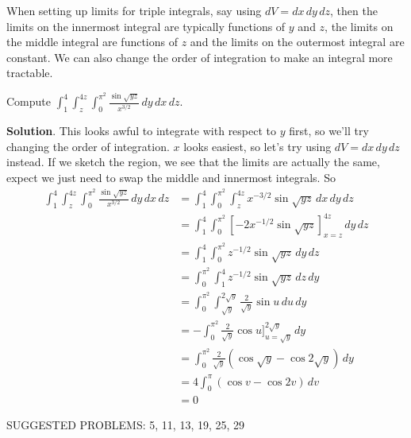 \documentclass[10pt,]{book}
\theoremstyle{ptxplainnotitle}
\theoremstyle{ptxplaintitle}
\theoremstyle{ptxplainnotitle}
\theoremstyle{ptxplaintitle}
\theoremstyle{ptxplainnotitle}
\theoremstyle{ptxplaintitle}
\theoremstyle{ptxdefinitionnotitle}
\theoremstyle{ptxdefinitiontitle}
\theoremstyle{ptxdefinitionnotitle}
\theoremstyle{ptxdefinitiontitle}
\theoremstyle{ptxdefinitionnotitle}
\theoremstyle{ptxdefinitiontitle}
\theoremstyle{ptxdefinitionnotitle}
\theoremstyle{ptxdefinitiontitle}
\theoremstyle{ptxdefinitionnotitle}
\theoremstyle{ptxdefinitiontitle}
\numberwithin{equation}{section}
\begin{document}
\hypertarget{p-1173}{}%
When setting up limits for triple integrals, say using \(dV = dx\,dy\,dz\), then the limits on the innermost integral are typically functions of \(y\) and \(z\), the limits on the middle integral are functions of \(z\) and the limits on the outermost integral are constant. We can also change the order of integration to make an integral more tractable.%
\begin{example}\label{example-changing-the-order-of-integration}
\hypertarget{p-1174}{}%
Compute \(\int_{1}^{4}\int_{z}^{4z}\int_{0}^{\pi^{2}}\frac{\sin\sqrt{yz}}{x^{3/2}}\,dy\,dx\,dz\).%
\par\smallskip%
\noindent\textbf{Solution}.\hypertarget{solution-189}{}\quad%
\hypertarget{p-1175}{}%
This looks awful to integrate with respect to \(y\) first, so we'll try changing the order of integration. \(x\) looks easiest, so let's try using \(dV = dx\,dy\,dz\) instead. If we sketch the region, we see that the limits are actually the same, expect we just need to swap the middle and innermost integrals. So%
\begin{align*}
\int_{1}^{4}\int_{z}^{4z}\int_{0}^{\pi^{2}}\frac{\sin\sqrt{yz}}{x^{3/2}}\,dy\,dx\,dz  & = \int_{1}^{4}\int_{0}^{\pi^{2}}\int_{z}^{4z}x^{-3/2}\sin\sqrt{yz}\,dx\,dy\,dz \\
& = \int_{1}^{4}\int_{0}^{\pi^{2}}\left[-2x^{-1/2}\sin\sqrt{yz}\right]_{x=z}^{4z}\,dy\,dz \\
& = \int_{1}^{4}\int_{0}^{\pi^{2}}z^{-1/2}\sin\sqrt{yz}\,dy\,dz \\
& = \int_{0}^{\pi^{2}}\int_{1}^{4}z^{-1/2}\sin\sqrt{yz}\,dz\,dy \\
& = \int_{0}^{\pi^{2}}\int_{\sqrt{y}}^{2\sqrt{y}}\frac{2}{\sqrt{y}}\sin u\,du\,dy \\
& = -\int_{0}^{\pi^{2}}\frac{2}{\sqrt{y}}\cos u\bigg]_{u=\sqrt{y}}^{2\sqrt{y}}\,dy \\
& = \int_{0}^{\pi^{2}}\frac{2}{\sqrt{y}}(\cos\sqrt{y} - \cos2\sqrt{y})\,dy \\
& = 4\int_{0}^{\pi} (\cos v - \cos2v)\,dv \\
& = 0 
\end{align*}
%
\end{example}
\hypertarget{p-1176}{}%
SUGGESTED PROBLEMS: 5, 11, 13, 19, 25, 29%
\typeout{************************************************}
\typeout{************************************************}
\end{document}
